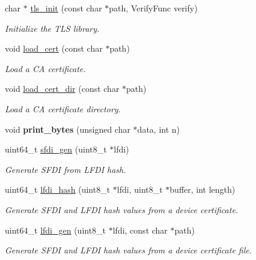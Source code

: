 \begin{DoxyCompactItemize}
\item 
char $\ast$ \hyperlink{group__security_gabae7ae3a93a3e0e7d8375a3f3a25724d}{tls\+\_\+init} (const char $\ast$path, Verify\+Func verify)
\begin{DoxyCompactList}\small\item\em Initialize the T\+LS library. \end{DoxyCompactList}\item 
void \hyperlink{group__security_gadea9b85056a9814af0f31825e3c4cfe7}{load\+\_\+cert} (const char $\ast$path)
\begin{DoxyCompactList}\small\item\em Load a CA certificate. \end{DoxyCompactList}\item 
void \hyperlink{group__security_ga7a1ba6975237933bc8447986ea73fe08}{load\+\_\+cert\+\_\+dir} (const char $\ast$path)
\begin{DoxyCompactList}\small\item\em Load a CA certificate directory. \end{DoxyCompactList}\item 
\mbox{\label{group__security_ga6821c2ae8cba93d7e61ebbb3bab48002}} 
void {\bfseries print\+\_\+bytes} (unsigned char $\ast$data, int n)
\item 
uint64\+\_\+t \hyperlink{group__security_ga0e83013b684ca7c97129148e672a5d83}{sfdi\+\_\+gen} (uint8\+\_\+t $\ast$lfdi)
\begin{DoxyCompactList}\small\item\em Generate S\+F\+DI from L\+F\+DI hash. \end{DoxyCompactList}\item 
uint64\+\_\+t \hyperlink{group__security_ga0c3b1ec1fd87c9cfb07b82f97655ed1f}{lfdi\+\_\+hash} (uint8\+\_\+t $\ast$lfdi, uint8\+\_\+t $\ast$buffer, int length)
\begin{DoxyCompactList}\small\item\em Generate S\+F\+DI and L\+F\+DI hash values from a device certificate. \end{DoxyCompactList}\item 
uint64\+\_\+t \hyperlink{group__security_ga6dbafb6acf80fc86e418814b288a7e1a}{lfdi\+\_\+gen} (uint8\+\_\+t $\ast$lfdi, const char $\ast$path)
\begin{DoxyCompactList}\small\item\em Generate S\+F\+DI and L\+F\+DI hash values from a device certificate file. \end{DoxyCompactList}\item 

\end{DoxyCompactItemize}
